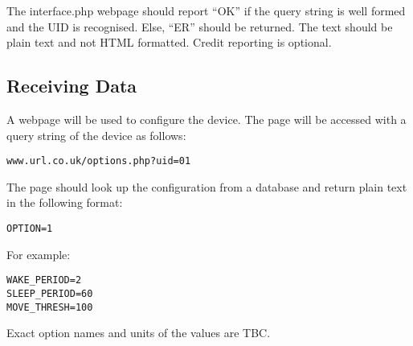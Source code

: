 \documentclass[12pt]{article}
\begin{document}
The interface.php webpage should report ``OK'' if the query string is well formed and the UID is recognised. 
Else, ``ER'' should be returned. 
The text should be plain text and not HTML formatted.
Credit reporting is optional. 

\subsection{Receiving Data}

A webpage will be used to configure the device.
The page will be accessed with a query string of the device as follows:

\begin{lstlisting}
www.url.co.uk/options.php?uid=01
\end{lstlisting}

The page should look up the configuration from a database and return plain text in the following format:

\begin{lstlisting}
OPTION=1
\end{lstlisting}
For example:

\begin{lstlisting}
WAKE_PERIOD=2
SLEEP_PERIOD=60
MOVE_THRESH=100
\end{lstlisting}

Exact option names and units of the values are TBC. 
\end{document}
